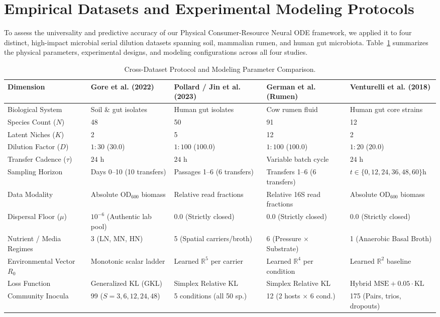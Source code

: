 \section{Empirical Datasets and Experimental Modeling Protocols}
\label{sec:datasets}

To assess the universality and predictive accuracy of our Physical Consumer-Resource Neural ODE framework, we applied it to four distinct, high-impact microbial serial dilution datasets spanning soil, mammalian rumen, and human gut microbiota. Table~\ref{tab:protocols} summarizes the physical parameters, experimental designs, and modeling configurations across all four studies.

\begin{table}[t]
\centering
\small
\caption{Cross-Dataset Protocol and Modeling Parameter Comparison.}
\label{tab:protocols}
\begin{tabularx}{\textwidth}{lXXXX}
\toprule
\textbf{Dimension} & \textbf{Gore et al. (2022)} & \textbf{Pollard / Jin et al. (2023)} & \textbf{German et al. (Rumen)} & \textbf{Venturelli et al. (2018)} \\
\midrule
Biological System & Soil \& gut isolates & Human gut isolates & Cow rumen fluid & Human gut core strains \\
Species Count ($N$) & 48 & 50 & 91 & 12 \\
Latent Niches ($K$) & 2 & 5 & 12 & 2 \\
Dilution Factor ($D$) & $1:30$ ($30.0$) & $1:100$ ($100.0$) & $1:100$ ($100.0$) & $1:20$ ($20.0$) \\
Transfer Cadence ($\tau$) & $24\text{ h}$ & $24\text{ h}$ & Variable batch cycle & $24\text{ h}$ \\
Sampling Horizon & Days 0--10 (10 transfers) & Passages 1--6 (6 transfers) & Transfers 1--6 (6 transfers) & $t \in \{0, 12, 24, 36, 48, 60\}\text{h}$ \\
Data Modality & Absolute $\text{OD}_{600}$ biomass & Relative read fractions & Relative 16S read fractions & Absolute $\text{OD}_{600}$ biomass \\
Dispersal Floor ($\mu$) & $10^{-6}$ (Authentic lab pool) & $0.0$ (Strictly closed) & $0.0$ (Strictly closed) & $0.0$ (Strictly closed) \\
Nutrient / Media Regimes & 3 (LN, MN, HN) & 5 (Spatial carriers/broth) & 6 (Pressure $\times$ Substrate) & 1 (Anaerobic Basal Broth) \\
Environmental Vector $R_0$ & Monotonic scalar ladder & Learned $\mathbb{R}^5$ per carrier & Learned $\mathbb{R}^4$ per condition & Learned $\mathbb{R}^2$ baseline \\
Loss Function & Generalized KL (GKL) & Simplex Relative KL & Simplex Relative KL & Hybrid $\text{MSE} + 0.05 \cdot \text{KL}$ \\
Community Inocula & 99 ($S=3,6,12,24,48$) & 5 conditions (all 50 sp.) & 12 (2 hosts $\times$ 6 cond.) & 175 (Pairs, trios, dropouts) \\
\bottomrule
\end{tabularx}
\end{table}

